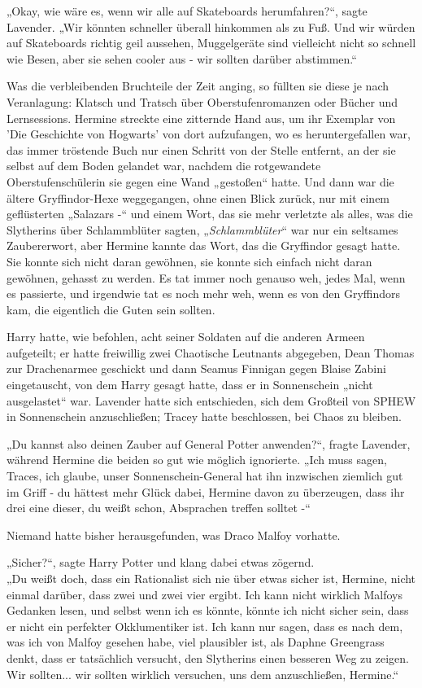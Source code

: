 {„Okay, wie wäre es, wenn wir alle auf Skateboards herumfahren?“, sagte Lavender. „Wir könnten schneller überall hinkommen als zu Fuß. Und wir würden auf Skateboards richtig geil aussehen, Muggelgeräte sind vielleicht nicht so schnell wie Besen, aber sie sehen cooler aus - wir sollten darüber abstimmen.“

Was die verbleibenden Bruchteile der Zeit anging, so füllten sie diese je nach Veranlagung: Klatsch und Tratsch über Oberstufenromanzen oder Bücher und Lernsessions. Hermine streckte eine zitternde Hand aus, um ihr Exemplar von 'Die Geschichte von Hogwarts' von dort aufzufangen, wo es heruntergefallen war, das immer tröstende Buch nur einen Schritt von der Stelle entfernt, an der sie selbst auf dem Boden gelandet war, nachdem die rotgewandete Oberstufenschülerin sie gegen eine Wand „gestoßen“ hatte. Und dann war die ältere Gryffindor-Hexe weggegangen, ohne einen Blick zurück, nur mit einem geflüsterten „Salazars -“ und einem Wort, das sie mehr verletzte als alles, was die Slytherins über Schlammblüter sagten, „\emph{Schlammblüter}“ war nur ein seltsames Zaubererwort, aber Hermine kannte das Wort, das die Gryffindor gesagt hatte. Sie konnte sich nicht daran gewöhnen, sie konnte sich einfach nicht daran gewöhnen, gehasst zu werden. Es tat immer noch genauso weh, jedes Mal, wenn es passierte, und irgendwie tat es noch mehr weh, wenn es von den Gryffindors kam, die eigentlich die Guten sein sollten.

Harry hatte, wie befohlen, acht seiner Soldaten auf die anderen Armeen aufgeteilt; er hatte freiwillig zwei Chaotische Leutnants abgegeben, Dean Thomas zur Drachenarmee geschickt und dann Seamus Finnigan gegen Blaise Zabini eingetauscht, von dem Harry gesagt hatte, dass er in Sonnenschein „nicht ausgelastet“ war. Lavender hatte sich entschieden, sich dem Großteil von SPHEW in Sonnenschein anzuschließen; Tracey hatte beschlossen, bei Chaos zu bleiben.

„Du kannst also deinen Zauber auf General Potter anwenden?“, fragte Lavender, während Hermine die beiden so gut wie möglich ignorierte. „Ich muss sagen, Traces, ich glaube, unser Sonnenschein-General hat ihn inzwischen ziemlich gut im Griff - du hättest mehr Glück dabei, Hermine davon zu überzeugen, dass ihr drei eine dieser, du weißt schon, Absprachen treffen solltet -“

Niemand hatte bisher herausgefunden, was Draco Malfoy vorhatte.

„Sicher?“, sagte Harry Potter und klang dabei etwas zögernd.\\ „Du weißt doch, dass ein Rationalist sich nie über etwas sicher ist, Hermine, nicht einmal darüber, dass zwei und zwei vier ergibt. Ich kann nicht wirklich Malfoys Gedanken lesen, und selbst wenn ich es könnte, könnte ich nicht sicher sein, dass er nicht ein perfekter Okklumentiker ist. Ich kann nur sagen, dass es nach dem, was ich von Malfoy gesehen habe, viel plausibler ist, als Daphne Greengrass denkt, dass er tatsächlich versucht, den Slytherins einen besseren Weg zu zeigen. Wir sollten... wir sollten wirklich versuchen, uns dem anzuschließen, Hermine.“

}
